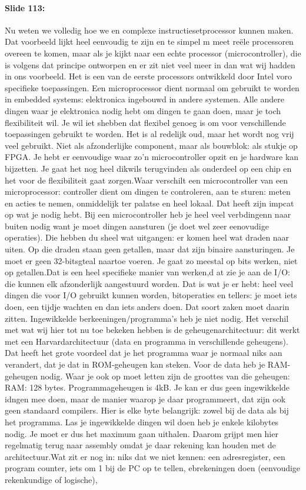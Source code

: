 \documentclass[10pt,a4paper]{book}
\begin{document}
\paragraph{Slide 113:} Nu weten we volledig hoe we en complexe instructiesetprocessor kunnen maken. Dat voorbeeld lijkt heel eenvoudig te zijn en te simpel m meet re\"ele processoren overeen te komen, maar als je kijkt naar een echte processor (microcontroller), die is volgens dat principe ontworpen en er zit niet veel meer in dan wat wij hadden in ons voorbeeld. Het is een van de eerste processors ontwikkeld door Intel voro specifieke toepassingen. Een microprocessor dient normaal om gebruikt te worden in embedded systems: elektronica ingebouwd in andere systemen. Alle andere dingen waar je elektronica nodig hebt om dingen te gaan doen, maar je toch flexibiliteit wil. Je wil iet shebben dat flexibel genoeg is om voor verschillende toepassingen gebruikt te worden. Het is al redelijk oud, maar het wordt nog vrij veel gebruikt. Niet als afzonderlijke component, maar als bouwblok: als stukje op FPGA. Je hebt er eenvoudige waar zo'n microcontroller opzit en je hardware kan bijzetten. Je gaat het nog heel dikwils terugvinden als onderdeel op een chip en het voor de flexibiliteit gaat zorgen.Waar verschilt een microcontroller van een microprocessor: controller dient om dingen te controleren, aan te sturen: meten en acties te nemen, onmiddelijk ter palatse en heel lokaal. Dat heeft zijn impcat op wat je nodig hebt. Bij een microcontroller heb je heel veel verbdingenn naar buiten nodig want je moet dingen aansturen (je doet wel zeer eenovudige operaties). Die hebben du sheel wat uitgangen: er komen heel wat draden naar uiten. Op die draden staan geen getallen, maar dat zijn binaire aansturingen. Je moet er geen 32-bitsgteal naartoe voeren. Je gaat zo meestal op bits werken, niet op getallen.Dat is een heel specifieke manier van werken,d at zie je aan de I/O: die kunnen elk afzonderlijk aangestuurd worden. Dat is wat je er hebt: heel veel dingen die voor I/O gebruikt kunnen worden, bitoperaties en tellers: je moet iets doen, een tijdje wachten en dan iets anders doen. Dat soort zaken moet daarin zitten. Ingewikkelde berkeeningen/programma's heb je niet nodig. Het verschil met wat wij hier tot nu toe bekeken hebben is de geheugenarchitectuur: dit werkt met een Harvardarchitectuur (data en programma in verschillende geheugens). Dat heeft het grote voordeel dat je het programma waar je normaal niks aan verandert, dat je dat in ROM-geheugen kan steken. Voor de data heb je RAM-geheugen nodig. Waar je ook op moet letten zijn de groottes van die geheugen: RAM: 128 bytes. Programmageheugen is 4kB. Je kan er dus geen ingewikkelde idngen mee doen, maar de manier waarop je daar programmeert, dat zijn ook geen standaard compilers. Hier is elke byte belangrijk: zowel bij de data als bij het programma. Las je ingewikkelde dingen wil doen heb je enkele kilobytes nodig. Je moet er dus het maximum gaan uithalen. Daarom grijpt men hier regelmatig terug naar assembly omdat je daar rekening kan houden met de architectuur.Wat zit er nog in: niks dat we niet kennen: een adresregister, een program counter, iets om 1 bij de PC op te tellen, ebrekeningen doen (eenvoudige rekenkundige of logische), 
\end{document}
